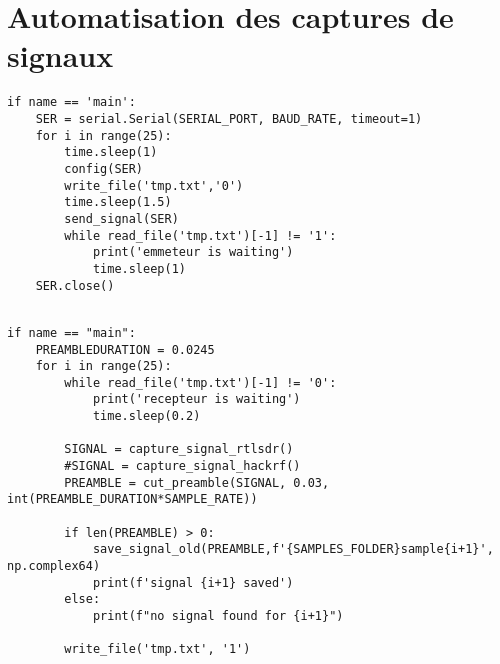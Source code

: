 \newpage

\section{Automatisation des captures de signaux}\label{codeauto}


\begin{lstlisting}[style=pythonstyle, caption={Emetteur}, label={lst:python}]
if name == 'main':
    SER = serial.Serial(SERIAL_PORT, BAUD_RATE, timeout=1)
    for i in range(25):
        time.sleep(1)
        config(SER)
        write_file('tmp.txt','0')
        time.sleep(1.5)
        send_signal(SER)
        while read_file('tmp.txt')[-1] != '1':
            print('emmeteur is waiting')
            time.sleep(1)
    SER.close()
\end{lstlisting}

\begin{lstlisting}[style=pythonstyle, caption={Récepteur}, label={lst:python}]

if name == "main":
    PREAMBLEDURATION = 0.0245
    for i in range(25):
        while read_file('tmp.txt')[-1] != '0':
            print('recepteur is waiting')
            time.sleep(0.2)

        SIGNAL = capture_signal_rtlsdr()
        #SIGNAL = capture_signal_hackrf()
        PREAMBLE = cut_preamble(SIGNAL, 0.03, int(PREAMBLE_DURATION*SAMPLE_RATE))

        if len(PREAMBLE) > 0:
            save_signal_old(PREAMBLE,f'{SAMPLES_FOLDER}sample{i+1}', np.complex64)
            print(f'signal {i+1} saved')
        else:
            print(f"no signal found for {i+1}")

        write_file('tmp.txt', '1')
\end{lstlisting}

